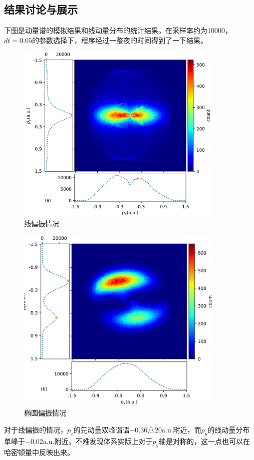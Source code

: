 \documentclass[a4paper]{ctexart}
\begin{document}
\subsection{结果讨论与展示}
下图是动量谱的模拟结果和线动量分布的统计结果。在采样率约为10000，$dt=0.05$的参数选择下，程序经过一整夜的时间得到了一下结果。
\begin{figure}[hbt]
	\centering
	\includegraphics[width=10cm]{./fig/Prob2_3.png}
	\caption{线偏振情况}
\end{figure}
\begin{figure}[hbt]
	\centering
	\includegraphics[width=10cm]{./fig/Prob2_4.png}
	\caption{椭圆偏振情况}
\end{figure}
对于线偏振的情况，$p_z$的先动量双峰谓语$-0.36$,$0.20\text{a.u.}$附近，而$p_y$的线动量分布单峰于$-0.02\text{a.u.}$附近。不难发现体系实际上对于$p_y$轴是对称的，这一点也可以在哈密顿量中反映出来。
\end{document}
